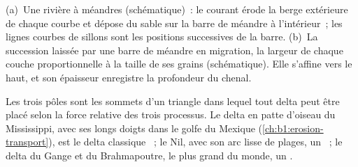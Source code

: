\begin{omfigure}

{\small (a)~Une rivière à méandres (schématique)~: le courant érode la berge extérieure de
chaque courbe et dépose du sable sur la barre de méandre à l'intérieur~; les lignes courbes de
sillons sont les positions successives de la barre. (b)~La succession laissée par une barre de méandre
en migration, la largeur de chaque couche proportionnelle à la taille de ses grains (schématique). Elle
s'affine vers le haut, et son épaisseur enregistre la profondeur du chenal.}
\label{fig:b1:clastic-sediments:point-bar}
\end{omfigure}

Les trois pôles sont les sommets d'un triangle dans lequel tout delta peut être
placé selon la force relative des trois processus. Le delta en patte d'oiseau du
Mississippi, avec ses longs doigts dans le golfe du Mexique
(\cref{ch:b1:erosion-transport}), est le delta classique ~; le
Nil, avec son arc lisse de plages, un ~; le delta du
Gange et du Brahmapoutre, le plus grand du monde, un .

